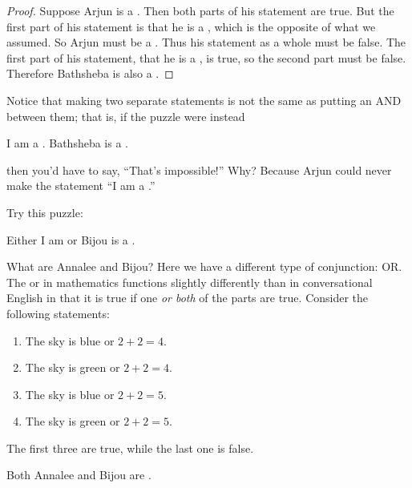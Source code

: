\documentclass{tufte-book}
\begin{document}
\begin{proof}
  Suppose Arjun is a \knight. Then both parts of his statement are true. But the first part of his statement is that he is a \knave, which is the opposite of what we assumed. So Arjun must be a \knave. Thus his statement as a whole must be false. The first part of his statement, that he is a \knave, is true, so the second part must be false. Therefore Bathsheba is also a \knave.
\end{proof}

Notice that making two separate statements is not the same as putting an AND between them; that is, if the puzzle were instead
\begin{example}
  \begin{dialogue}
     I am a \knave. Bathsheba is a \knight.
  \end{dialogue}
\end{example}
then you'd have to say, ``That's impossible!'' Why? Because Arjun could never make the statement ``I am a \knave.''

Try this puzzle:
\begin{example}
  \begin{dialogue}
     Either I am \knave or Bijou is a \knight.
  \end{dialogue}
\end{example}
What are Annalee and Bijou? Here we have a different type of conjunction: OR. The or in mathematics functions slightly differently than in conversational English in that it is true if one \emph{or both} of the parts are true. Consider the following statements:
\begin{enumerate}
    \item The sky is blue or $2 + 2 = 4$.
    \item The sky is green or $2 + 2 = 4$.
    \item The sky is blue or $2 + 2 = 5$.
    \item The sky is green or $2 + 2 = 5$.
\end{enumerate}
The first three are true, while the last one is false. 

\begin{claim}
  Both Annalee and Bijou are \knights.
\end{claim}
\end{document}
